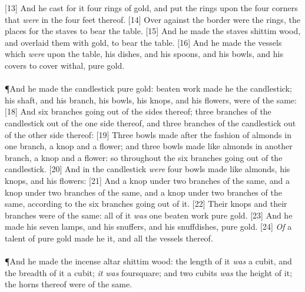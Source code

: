 [13] \textcolor[cmyk]{0.99998,1,0,0}{And he cast for it four rings of gold, and put the rings upon the four corners that \emph{were} in the four feet thereof.}
[14] \textcolor[cmyk]{0.99998,1,0,0}{Over against the border were the rings, the places for the staves to bear the table.}
[15] \textcolor[cmyk]{0.99998,1,0,0}{And he made the staves  shittim wood, and overlaid them with gold, to bear the table.}
[16] \textcolor[cmyk]{0.99998,1,0,0}{And he made the vessels which \emph{were} upon the table, his dishes, and his spoons, and his bowls, and his covers to cover withal,  pure gold.}\\
\\
\P \textcolor[cmyk]{0.99998,1,0,0}{And he made the candlestick  pure gold:  beaten work made he the candlestick; his shaft, and his branch, his bowls, his knops, and his flowers, were of the same:}
[18] \textcolor[cmyk]{0.99998,1,0,0}{And six branches going out of the sides thereof; three branches of the candlestick out of the one side thereof, and three branches of the candlestick out of the other side thereof:}
[19] \textcolor[cmyk]{0.99998,1,0,0}{Three bowls made after the fashion of almonds in one branch, a knop and a flower; and three bowls made like almonds in another branch, a knop and a flower: so throughout the six branches going out of the candlestick.}
[20] \textcolor[cmyk]{0.99998,1,0,0}{And in the candlestick \emph{were} four bowls made like almonds, his knops, and his flowers:}
[21] \textcolor[cmyk]{0.99998,1,0,0}{And a knop under two branches of the same, and a knop under two branches of the same, and a knop under two branches of the same, according to the six branches going out of it.}
[22] \textcolor[cmyk]{0.99998,1,0,0}{Their knops and their branches were of the same: all of it \emph{was} one beaten work  pure gold.}
[23] \textcolor[cmyk]{0.99998,1,0,0}{And he made his seven lamps, and his snuffers, and his snuffdishes,  pure gold.}
[24] \textcolor[cmyk]{0.99998,1,0,0}{\emph{Of} a talent of pure gold made he it, and all the vessels thereof.}\\
\\
\P \textcolor[cmyk]{0.99998,1,0,0}{And he made the incense altar  shittim wood: the length of it \emph{was} a cubit, and the breadth of it a cubit; \emph{it} \emph{was} foursquare; and two cubits \emph{was} the height of it; the horns thereof were of the same.}
